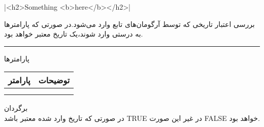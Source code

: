 |<h2>Something <b>here</b></h2>|

بررسی اعتبار تاریخی که توسط آرگومان‌های تابع وارد می‌شود.در صورتی که پارامترها به درستی وارد شوند،یک تاریخ معتبر خواهد بود.
\\
\rule{\linewidth}{0.5mm}

پارامترها
\\
\begin{tabular}{|c|c|}
	\hline
	 پارامتر	& توضیحات \\
	\hline
	&  \\
	\hline
	&  \\
	\hline
\end{tabular}

برگردان
\\
در صورتی که تاریخ وارد شده معتبر باشد TRUE در غیر این صورت FALSE خواهد بود.

